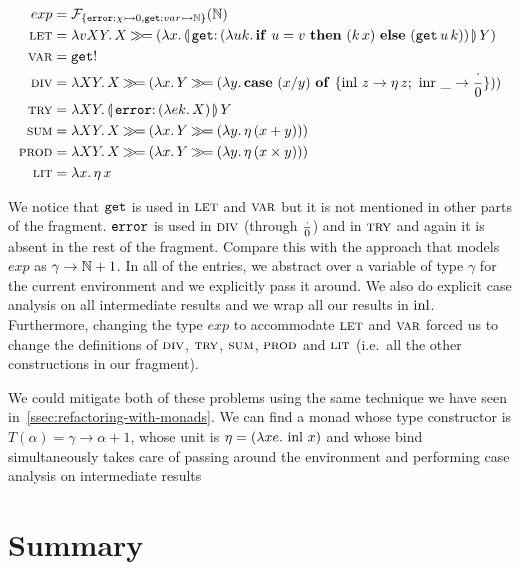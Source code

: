 \begin{align*}
  exp &= \FF_{\{\typedop{error}{\chi}{0},\typedop{get}{var}{\NN}\}}(\NN) \\
  \lete &= \lam{v X Y}{X \hsbind
    (\lam{x}{\ap{\banana{\onto{\op{get}}{(\lam{u k}{\ifte{u = v}{(\ap{k}{x})}{(\app{\op{get}}{u}{k})}})}}}{Y}})} \\
  \vare &= \op{get}! \\
  \dive &= \lam{X Y}{X \hsbind (\lam{x}{Y \hsbind (\lam{y}{\case{(x / y)}{z}{\ap{\eta}{z}}{\_}{\dbze}})})} \\
  \trye &= \lam{X Y}{\ap{\banana{\onto{\op{error}}{(\lam{e k}{X})}}}{Y}} \\
  \sume &= \lam{X Y}{X \hsbind (\lam{x}{Y \hsbind (\lam{y}{\ap{\eta}{(x + y)}})})} \\
  \prode &= \lam{X Y}{X \hsbind (\lam{x}{Y \hsbind (\lam{y}{\ap{\eta}{(x \times y)}})})} \\
  \lite &= \lam{x}{\etaE{x}}
\end{align*}

We notice that $\mathtt{get}$ is used in $\textsc{let}$ and $\textsc{var}$ but it is not
mentioned in other parts of the fragment. $\mathtt{error}$ is used in $\textsc{div}$
(through $\frac{\cdot}{0}$) and in $\textsc{try}$ and again it is absent in the rest of the
fragment. Compare this with the approach that models $exp$ as
$\gamma \to \mathbb{N} + 1$. In all of the entries, we abstract over a variable of
type $\gamma$ for the current environment and we explicitly pass it
around. We also do explicit case analysis on all intermediate results and
we wrap all our results in $\operatorname{inl}$. Furthermore, changing the type $exp$ to
accommodate $\textsc{let}$ and $\textsc{var}$ forced us to change the definitions of
$\textsc{div}$, $\textsc{try}$, $\textsc{sum}$, $\textsc{prod}$ and $\textsc{lit}$ (i.e.\ all the other
constructions in our fragment).

We could mitigate both of these problems using the same technique we have
seen in~\ref{ssec:refactoring-with-monads}. We can find a monad whose type
constructor is $T(\alpha) = \gamma \to \alpha + 1$, whose unit is $\eta =
(\lambda x e.\, \operatorname{inl}\,x)$ and whose bind simultaneously takes care of
passing around the environment and performing case analysis on intermediate
results



\section{Summary}

